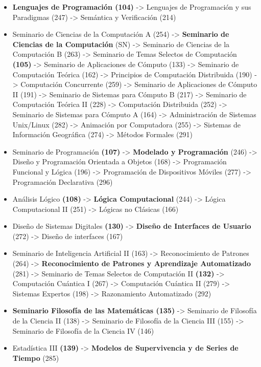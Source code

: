 \begin{appendices}
\begin{enumerate}
\begin{itemize}
  \item \textbf{Lenguajes de Programación (104)} -> Lenguajes de Programación y sus Paradigmas (247) -> Semántica y Verificación (214)
  
  \item Seminario de Ciencias de la Computación A (254) -> \textbf{Seminario de Ciencias de la Computación} (SN) -> Seminario de Ciencias de la Computación B (263) -> Seminario de Temas Selectos de Computación \textbf{(105)} -> Seminario de Aplicaciones de Cómputo (133) -> Seminario de Computación Teórica (162) -> Principios de Computación Distribuida (190) -> Computación Concurrente (259) -> Seminario de Aplicaciones de Cómputo II (191) -> Seminario de Sistemas para Cómputo B (217) -> Seminario de Computación Teórica II (228) -> Computación Distribuida (252) -> Seminario de Sistemas para Cómputo A (164) -> Administración de Sistemas Unix/Linux (282) -> Animación por Computadora (255) -> Sistemas de Información Geográfica (274) -> Métodos Formales (291)
  
  \item Seminario de Programación \textbf{(107)} -> \textbf{Modelado y Programación} (246) -> Diseño y Programación Orientada a Objetos (168) -> Programación Funcional y Lógica (196) -> Programación de Dispositivos Móviles (277) -> Programación Declarativa (296)
  
  \item Análisis Lógico \textbf{(108)} -> \textbf{Lógica Computacional} (244) -> Lógica Computacional II (251) -> Lógicas no Clásicas (166)
  
  \item Diseño de Sistemas Digitales \textbf{(130)} -> \textbf{Diseño de Interfaces de Usuario} (272) -> Diseño de interfaces (167)

  \item Seminario de Inteligencia Artificial II (163) -> Reconocimiento de Patrones (264) -> \textbf{Reconocimiento de Patrones y Aprendizaje Automatizado} (281) -> Seminario de Temas Selectos de Computación II \textbf{(132)} -> Computación Cuántica I (267) -> Computación Cuántica II (279) -> Sistemas Expertos (198) -> Razonamiento Automatizado (292)

  \item \textbf{Seminario Filosofía de las Matemáticas (135)} -> Seminario de Filosofía de la Ciencia II (138) -> Seminario de Filosofía de la Ciencia III (155) -> Seminario de Filosofía de la Ciencia IV (146)
  
  \item Estadística III \textbf{(139)} -> \textbf{Modelos de Supervivencia y de Series de Tiempo} (285)
    

\end{itemize}
\end{enumerate}
\end{appendices}
